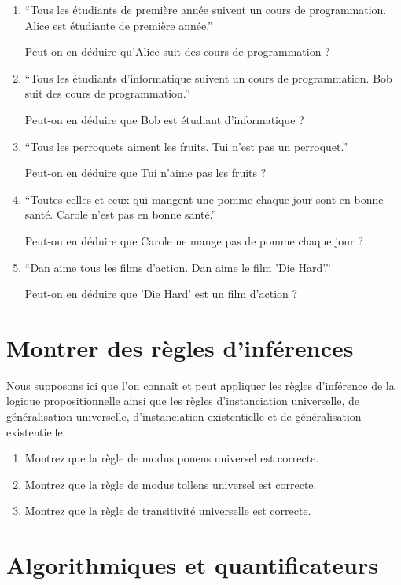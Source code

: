 \documentclass[a4paper,11pt]{article}
\begin{document}
\begin{enumerate}
\item ``Tous les étudiants de première année suivent un cours de programmation. Alice est étudiante de première année.''

Peut-on en déduire qu'Alice suit des cours de programmation ?

\item ``Tous les étudiants d'informatique suivent un cours de programmation. Bob suit des cours de programmation.''

Peut-on en déduire que Bob est étudiant d'informatique ?

\item ``Tous les perroquets aiment les fruits. Tui n'est pas un perroquet.''

Peut-on en déduire que Tui n'aime pas les fruits ?

\item ``Toutes celles et ceux qui mangent une pomme chaque jour sont en bonne santé. Carole n'est pas en bonne santé.''

Peut-on en déduire que Carole ne mange pas de pomme chaque jour ?

\item ``Dan aime tous les films d'action. Dan aime le film 'Die Hard'.''

Peut-on en déduire que 'Die Hard' est un film d'action ?
\end{enumerate}

\section{Montrer des règles d'inférences}

Nous supposons ici que l'on connaît et peut appliquer les règles d'inférence de la logique propositionnelle ainsi que les règles d'instanciation universelle, de généralisation universelle, d'instanciation existentielle et de généralisation existentielle.

\begin{enumerate}
\item Montrez que la règle de modus ponens universel est correcte.
\item Montrez que la règle de modus tollens universel est correcte.
\item Montrez que la règle de transitivité universelle est correcte.
\end{enumerate}

\section{Algorithmiques et quantificateurs}
\end{document}
